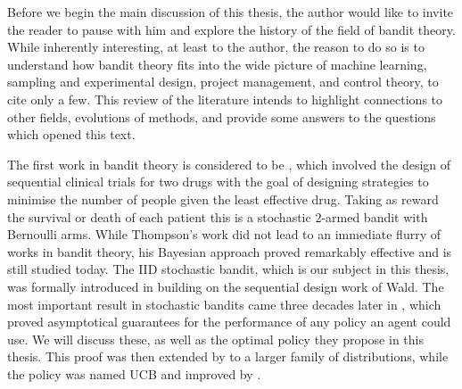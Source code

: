 
\par Before we begin the main discussion of this thesis, the author would like to invite the reader to pause with him and explore the history of the field of bandit theory. While inherently interesting, at least to the author, the reason to do so is to understand how bandit theory fits into the wide picture of machine learning, sampling and experimental design, project management, and control theory, to cite only a few. This review of the literature intends to highlight connections to other fields, evolutions of methods, and provide some answers to the questions which opened this text. 

\par The first work in bandit theory is considered to be \citet{thompson:1933}, which involved the design of sequential clinical trials for two drugs with the goal of designing strategies to minimise the number of people given the least effective drug. Taking as reward the survival or death of each patient this is a stochastic $2$-armed bandit with Bernoulli arms. While Thompson's work did not lead to an immediate flurry of works in bandit theory, his Bayesian approach proved remarkably effective and is still studied today\cite{agrawal:2012}. The IID stochastic bandit, which is our subject in this thesis, was formally introduced in \citet{robbins:1952} building on the sequential design work of Wald. The most important result in stochastic bandits came three decades later in \citet{lai-robbins:1985}, which proved asymptotical guarantees for the performance of any policy an agent could use. We will discuss these, as well as the optimal policy they propose in this thesis. This proof was then extended by \citet{burnetas:1996} to a larger family of distributions, while the policy was named UCB and improved by \citet{auer:2002}. 

